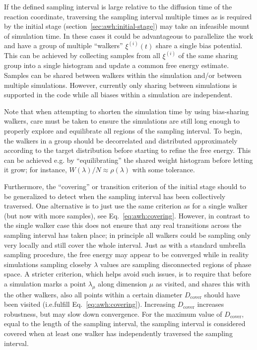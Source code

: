 If the defined  sampling interval is large relative to the diffusion time of the reaction coordinate,
traversing the sampling interval multiple times as is required by the initial stage (section~\ref{sec:awh:initial-stage})
may take an infeasible mount of simulation time.
In these cases it could be advantageous to parallelize the work and have a group of multiple ``walkers'' $\xi^{(i)}(t)$ share a single bias potential.
This can be achieved  by collecting samples from all  $\xi^{(i)}$ of the same sharing group into a single histogram and update a common free energy estimate.
Samples can be shared between walkers within the simulation and/or between multiple simulations.
However, currently only sharing between simulations is supported in the code while all biases within a simulation are independent.

Note that when attempting to shorten the simulation time by  using bias-sharing walkers,
 care must be taken to ensure the simulations are still long enough 
to properly explore and equilibrate all  regions of the sampling  interval.
To begin, the walkers in a group
should be decorrelated and distributed approximately according to the target distribution before starting to refine the free energy. 
This can be achieved e.g. by ``equilibrating'' the shared weight histogram before letting it grow;
for instance,   $W(\lambda)/N\approx \rho(\lambda)$ with some tolerance.

Furthermore, the ``covering'' or transition criterion of the initial stage should to be generalized to detect when the sampling interval has been collectively traversed.
One alternative is to just use the same criterion as for a single walker (but now with more samples), see Eq.~\ref{eq:awh:covering}.
However, in contrast to the single walker case this does not ensure that any real transitions across the sampling interval has taken place;
in principle all walkers could be sampling only very locally and still cover the whole interval.
Just as with a standard umbrella sampling procedure, the free energy may appear to be converged while in reality simulations sampling closeby $\lambda$ values
are sampling disconnected regions of phase space.
A stricter criterion, which helps avoid such issues, is to require that before a simulation marks a  point $\lambda_\mu$ along dimension $\mu$ as visited,
and shares this with the other walkers, 
also all points  within a certain diameter $D_{\mathrm{cover}}$ should have been visited (i.e.fulfill Eq.~\ref{eq:awh:covering}).
Increasing $D_{\mathrm{cover}}$ 
increases robustness, but may slow down convergence.
For the maximum value of $D_{\mathrm{cover}}$, equal to the length of the sampling interval, 
the sampling interval is considered covered when at least one walker has independently traversed the sampling interval.

